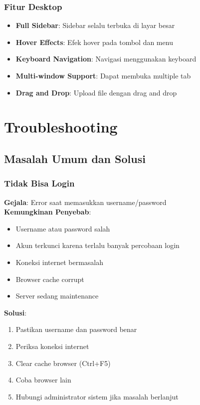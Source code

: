 \documentclass[12pt,a4paper]{article}
\begin{document}
\subsubsection{Fitur Desktop}
\begin{itemize}
\item \textbf{Full Sidebar}: Sidebar selalu terbuka di layar besar
\item \textbf{Hover Effects}: Efek hover pada tombol dan menu
\item \textbf{Keyboard Navigation}: Navigasi menggunakan keyboard
\item \textbf{Multi-window Support}: Dapat membuka multiple tab
\item \textbf{Drag and Drop}: Upload file dengan drag and drop
\end{itemize}

\section{Troubleshooting}

\subsection{Masalah Umum dan Solusi}

\subsubsection{Tidak Bisa Login}
\textbf{Gejala}: Error saat memasukkan username/password\\
\textbf{Kemungkinan Penyebab}:
\begin{itemize}
\item Username atau password salah
\item Akun terkunci karena terlalu banyak percobaan login
\item Koneksi internet bermasalah
\item Browser cache corrupt
\item Server sedang maintenance
\end{itemize}
\textbf{Solusi}:
\begin{enumerate}
\item Pastikan username dan password benar
\item Periksa koneksi internet
\item Clear cache browser (Ctrl+F5)
\item Coba browser lain
\item Hubungi administrator sistem jika masalah berlanjut
\end{enumerate}
\end{document}
